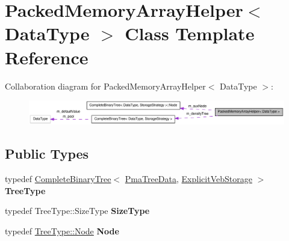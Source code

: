 \hypertarget{class_packed_memory_array_helper}{
\section{PackedMemoryArrayHelper$<$ DataType $>$ Class Template Reference}
\label{class_packed_memory_array_helper}
}


Collaboration diagram for PackedMemoryArrayHelper$<$ DataType $>$:\nopagebreak
\begin{figure}[H]
\begin{center}
\leavevmode
\includegraphics[width=400pt]{class_packed_memory_array_helper__coll__graph}
\end{center}
\end{figure}
\subsection*{Public Types}
\begin{DoxyCompactItemize}
\item 
\hypertarget{class_packed_memory_array_helper_af2cb70424ab029a8400464a5d82482ba}{
typedef \hyperlink{class_complete_binary_tree}{CompleteBinaryTree}$<$ \hyperlink{class_pma_tree_data}{PmaTreeData}, \hyperlink{class_explicit_veb_storage}{ExplicitVebStorage} $>$ {\bfseries TreeType}}
\label{class_packed_memory_array_helper_af2cb70424ab029a8400464a5d82482ba}

\item 
\hypertarget{class_packed_memory_array_helper_a83607cbeaa88776e4d561f398776e95f}{
typedef TreeType::SizeType {\bfseries SizeType}}
\label{class_packed_memory_array_helper_a83607cbeaa88776e4d561f398776e95f}

\item 
\hypertarget{class_packed_memory_array_helper_aaa87ea380a71f8819758f2431f7cfcf5}{
typedef \hyperlink{class_complete_binary_tree_1_1_node}{TreeType::Node} {\bfseries Node}}
\label{class_packed_memory_array_helper_aaa87ea380a71f8819758f2431f7cfcf5}

\end{DoxyCompactItemize}
